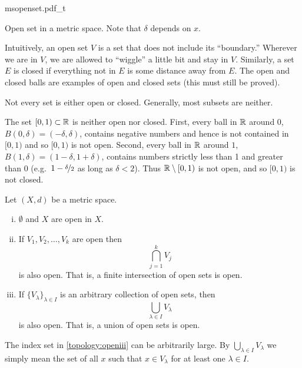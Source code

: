\begin{myfigureht}
{msopenset.pdf_t}
\caption{Open set in a metric space.  Note that $\delta$ depends on $x$.\label{fig:msopenset}}
\end{myfigureht}

Intuitively, an open set $V$ is a set that does not include its ``boundary.''
Wherever we are in $V$,
we are allowed to ``wiggle'' a little bit and
stay in $V$.  Similarly, a set $E$ is closed if everything not in $E$
is some distance away from $E$.
The open and closed balls are examples of open and closed sets
(this must still be proved).

Not every set is either open or closed.  Generally, most subsets are neither.

\begin{example}
The set $[0,1) \subset {\mathbb{R}}$ is neither open nor closed.  First,
every ball in ${\mathbb{R}}$ around $0$, $B(0,\delta) = (-\delta,\delta)$, contains negative
numbers and hence is not contained in $[0,1)$ and so $[0,1)$ is not open.
Second, every ball in ${\mathbb{R}}$ around $1$,
$B(1,\delta) = (1-\delta,1+\delta)$, contains
numbers strictly less than 1 and greater than 0
(e.g.\ $1-\nicefrac{\delta}{2}$ as long as $\delta < 2$).
Thus ${\mathbb{R}} \setminus
[0,1)$ is not open, and so $[0,1)$ is not closed.
\end{example}

\begin{prop} \label{prop:topology:open}
Let $(X,d)$ be a metric space.
\begin{enumerate}[(i)]
\item \label{topology:openi} $\emptyset$ and $X$ are open in $X$.
\item \label{topology:openii} If $V_1, V_2, \ldots, V_k$ are open then
\begin{equation*}
\bigcap_{j=1}^k V_j
\end{equation*}
is also open.  That is, a finite intersection of open sets is open.
\item \label{topology:openiii} If $\{ V_\lambda \}_{\lambda \in I}$ is
an arbitrary collection of open sets, then
\begin{equation*}
\bigcup_{\lambda \in I} V_\lambda
\end{equation*}
is also open.  That is, a union of open sets is open.
\end{enumerate}
\end{prop}

The index set in \ref{topology:openiii} can be arbitrarily large.
By $\bigcup_{\lambda \in I} V_\lambda$ we simply mean the set of
all $x$ such that $x \in V_\lambda$ for at least one $\lambda \in I$.

